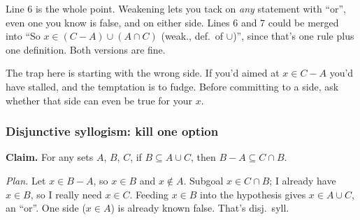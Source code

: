 \begin{center}
\end{center}

Line 6 is the whole point. Weakening lets you tack on \emph{any} statement with ``or'', even one you know is false, and on either side. Lines 6 and 7 could be merged into ``So $x\in(C-A)\cup(A\cap C)$ (weak., def.\ of $\cup$)'', since that's one rule plus one definition. Both versions are fine.

The trap here is starting with the wrong side. If you'd aimed at $x\in C-A$ you'd have stalled, and the temptation is to fudge. Before committing to a side, ask whether that side can even be true for your $x$.

\subsubsection{Disjunctive syllogism: kill one option}

\textbf{Claim.} For any sets $A$, $B$, $C$, if $B\subseteq A\cup C$, then $B-A\subseteq C\cap B$.

\emph{Plan.} Let $x\in B-A$, so $x\in B$ and $x\notin A$. Subgoal $x\in C\cap B$; I already have $x\in B$, so I really need $x\in C$. Feeding $x\in B$ into the hypothesis gives $x\in A\cup C$, an ``or''. One side ($x\in A$) is already known false. That's disj.\ syll.

